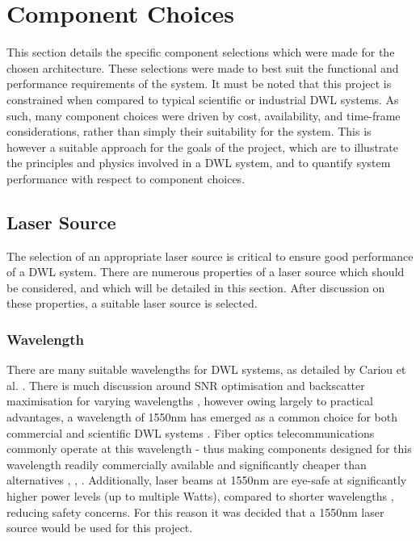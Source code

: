 \section{Component Choices}
\label{sec:design-ComponentChoices}
This section details the specific component selections which were made for the chosen architecture. These selections were made to best suit the functional and performance requirements of the system. It must be noted that this project is constrained when compared to typical scientific or industrial DWL systems. As such, many component choices were driven by cost, availability, and time-frame considerations, rather than simply their suitability for the system. This is however a suitable approach for the goals of the project, which are to illustrate the principles and physics involved in a DWL system, and to quantify system performance with respect to component choices. 
\subsection{Laser Source}
    The selection of an appropriate laser source is critical to ensure good performance of a DWL system. There are numerous properties of a laser source which should be considered, and which will be detailed in this section. After discussion on these properties, a suitable laser source is selected. 

    \subsubsection{Wavelength}
    There are many suitable wavelengths for DWL systems, as detailed by Cariou et al. \cite{cariou2006laser}. There is much discussion around SNR optimisation and backscatter maximisation for varying wavelengths \cite{bennett_doppler_2003}, however owing largely to practical advantages, a wavelength of 1550nm has emerged as a common choice for both commercial and scientific DWL systems \cite{abari_all-fiber_2014}. Fiber optics telecommunications  commonly operate at this wavelength - thus making components designed for this wavelength readily commercially available and significantly cheaper than alternatives \cite{cariou2006laser}, \cite{abdelazim_development_2015}, \cite{hill_remote_nodate}. Additionally, laser beams at 1550nm are eye-safe at significantly higher power levels (up to multiple Watts), compared to shorter wavelengths \cite{cariou2006laser}, reducing safety concerns. For this reason it was decided that a 1550nm laser source would be used for this project. 
    
